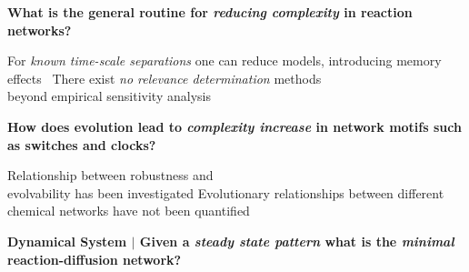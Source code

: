 \documentclass[a0,portrait]{a0poster}
\begin{document}
\begin{multicols}{2}

\begin{tcolorbox}[boxrule=2pt,arc=3.4pt,boxsep=2mm]
	\begin{center}
		\textbf{
		What is the general routine for \textit{reducing complexity} in reaction networks?}
	\end{center}
\end{tcolorbox}

\begin{itemize}[leftmargin=3cm]
	\up For \textit{known time-scale separations} one can reduce models, introducing memory effects~\cite{Phillies2000ProjectionFormalism}
	\down There exist \textit{no relevance determination} methods\\beyond
	empirical sensitivity analysis~\cite{Cardelli2016NoiseSwitches}
\end{itemize}

\vfill
\columnbreak

\begin{tcolorbox}[boxrule=2pt,arc=3.4pt,boxsep=2mm]
	\begin{center}
		\textbf{
		How does evolution lead to \textit{complexity increase} in network motifs such as switches and clocks?}
	\end{center}
\end{tcolorbox}

\begin{itemize}[leftmargin=3cm]
	\up Relationship between robustness and \\evolvability has been investigated \cite{Daniels2008SloppinessBiology}
	\down Evolutionary relationships between different chemical networks have not been quantified
\end{itemize}

\vfill
\end{multicols}
\vspace{1cm}

\begin{tcolorbox}[boxrule=2pt,arc=3.4pt,boxsep=2mm]
	\begin{center}
		\textbf{\color{Grey}Dynamical System \color{Black}$|$
		Given a \textit{steady state pattern} what is the \textit{minimal} reaction-diffusion network?}
	\end{center}
\end{tcolorbox}
\end{document}
